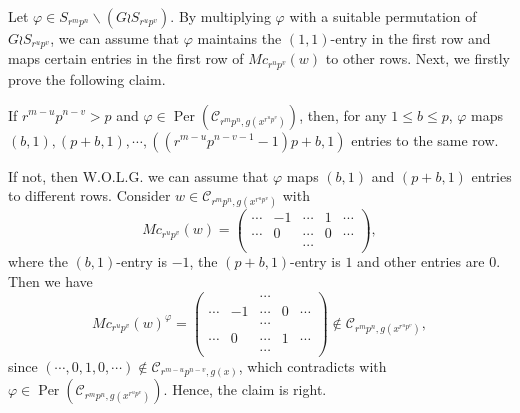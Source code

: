 \documentclass[journal,12pt,onecolumn]{IEEEtran}
\begin{document}
    Let $\varphi\in S_{r^mp^n}\backslash(G \wr S_{r^up^v})$. By multiplying $\varphi$ with a suitable permutation of $G \wr S_{r^up^v}$, we can assume that $\varphi$ maintains the $(1, 1)$-entry in the first row and maps certain entries in the first row of $Mc_{r^up^v}(w)$ to other rows. Next, we firstly prove the following claim.
    
      
     If $r^{m-u}p^{n-v}>p$ and $\varphi\in \operatorname{Per}(\mathcal{C}_{r^mp^n,g(x^{r^up^v})})$, then, for any $1\le b\le p$, $\varphi$ maps $(b,1),(p+b,1),\cdots,((r^{m-u}p^{n-v-1}-1)p+b,1)$ entries to the same row. 
      
    
     If not, then W.O.L.G. we can assume that $\varphi$ maps $(b,1)$ and $(p+b,1)$ entries to different rows. Consider $w\in\mathcal{C}_{r^mp^n,g(x^{r^up^v})}$ with
    \[
        Mc_{r^up^v}(w) = \begin{pmatrix}
            \cdots & -1 & \cdots & 1 & \cdots \\
            \cdots & 0 & \cdots & 0 & \cdots \\
             &   & \cdots &  & 
        \end{pmatrix},
    \]
    where the $(b,1)$-entry is $-1$, the $(p+b,1)$-entry is $1$ and other entries are $0$. Then we have
    \[
        Mc_{r^up^v}(w)^{\varphi} = \begin{pmatrix}
             &  & \cdots &  &  \\
            \cdots & -1 & \cdots & 0 & \cdots \\
             &  & \cdots &  &  \\
            \cdots & 0 & \cdots & 1 & \cdots \\
             &  & \cdots &  & 
        \end{pmatrix}\notin \mathcal{C}_{r^mp^n,g(x^{r^up^v})}, 
    \]
    since $(\cdots,0,1,0,\cdots)\notin\mathcal{C}_{r^{m-u}p^{n-v},g(x)}$, which contradicts with $\varphi\in \operatorname{Per}(\mathcal{C}_{r^mp^n,g(x^{r^up^v})})$. Hence, the claim is right. 
\end{document}

